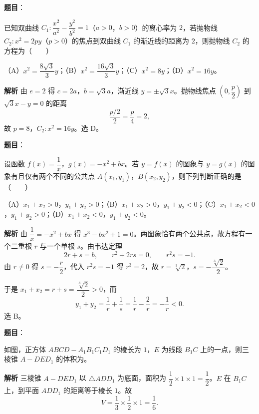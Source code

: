 \begin{answer}

\textbf{题目}：

已知双曲线 $C_1:\dfrac{x^2}{a^2}-\dfrac{y^2}{b^2}=1$（$a>0$，$b>0$）的离心率为 $2$，若抛物线 $C_2:x^2=2py$（$p>0$）的焦点到双曲线 $C_1$ 的渐近线的距离为 $2$，则抛物线 $C_2$ 的方程为\mbox{（　　）}

（A）$x^2=\dfrac{8\sqrt3}3y$；（B）$x^2=\dfrac{16\sqrt3}3y$；（C）$x^2=8y$；（D）$x^2=16y$。

\textbf{解析}
由 $e=2$ 得 $c=2a$，$b=\sqrt3a$，渐近线 $y=\pm\sqrt3x$。抛物线焦点 $\left(0,\dfrac p2\right)$ 到 $\sqrt3x-y=0$ 的距离
\nopagebreak[4]
\[\frac{p/2}{2}=\frac p4=2,\]
故 $p=8$，$C_2:x^2=16y$。选 D。


\end{answer}
\begin{answer}

\textbf{题目}：

设函数 $f(x)=\dfrac1x$，$g(x)=-x^2+bx$。若 $y=f(x)$ 的图象与 $y=g(x)$ 的图象有且仅有两个不同的公共点 $A(x_1,y_1)$，$B(x_2,y_2)$，则下列判断正确的是\mbox{（　　）}

（A）$x_1+x_2>0$，$y_1+y_2>0$；（B）$x_1+x_2>0$，$y_1+y_2<0$；（C）$x_1+x_2<0$，$y_1+y_2>0$；（D）$x_1+x_2<0$，$y_1+y_2<0$。

\textbf{解析}
由 $\dfrac1x=-x^2+bx$ 得 $x^3-bx^2+1=0$。两图象恰有两个公共点，故方程有一个二重根 $r$ 与一个单根 $s$。由韦达定理
\nopagebreak[4]
\[2r+s=b,\qquad r^2+2rs=0,\qquad r^2s=-1.\]
由 $r\neq0$ 得 $s=-\dfrac r2$，代入 $r^2s=-1$ 得 $r^3=2$，故 $r=\sqrt[3]2$，$s=-\dfrac{\sqrt[3]2}2$。

于是 $x_1+x_2=r+s=\dfrac{\sqrt[3]2}2>0$，而
\nopagebreak[4]
\[y_1+y_2=\frac1r+\frac1s=\frac1r-\frac2r=-\frac1r<0.\]
选 B。


\end{answer}
\begin{answer}

\textbf{题目}：

如图，正方体 $ABCD-A_1B_1C_1D_1$ 的棱长为 $1$，$E$ 为线段 $B_1C$ 上的一点，则三棱锥 $A-DED_1$ 的体积为\gkblank{}。
\nopagebreak[4]
\begin{center}\end{center}
\nopagebreak[4]
\textbf{解析}
三棱锥 $A-DED_1$ 以 $\triangle ADD_1$ 为底面，面积为 $\dfrac12\times1\times1=\dfrac12$。$E$ 在 $B_1C$ 上，到平面 $ADD_1$ 的距离等于棱长 $1$。故
\nopagebreak[4]
\[V=\frac13\times\frac12\times1=\frac16.\]


\end{answer}
